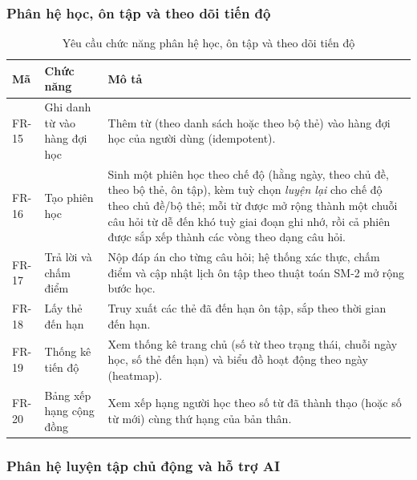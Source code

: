 \subsubsection{Phân hệ học, ôn tập và theo dõi tiến độ}

\begin{table}[h]
  \centering
  \small
  \renewcommand{\arraystretch}{1.3}
  \begin{tabular}{|p{1.7cm}|p{3.4cm}|p{9.4cm}|}
    \hline
    \textbf{Mã} & \textbf{Chức năng} & \textbf{Mô tả} \\
    \hline
    FR-15 & Ghi danh từ vào hàng đợi học & Thêm từ (theo danh sách hoặc theo bộ thẻ) vào hàng đợi học của người dùng (idempotent). \\
    \hline
    FR-16 & Tạo phiên học & Sinh một phiên học theo chế độ (hằng ngày, theo chủ đề, theo bộ thẻ, ôn tập), kèm tuỳ chọn \textit{luyện lại} cho chế độ theo chủ đề/bộ thẻ; mỗi từ được mở rộng thành một chuỗi câu hỏi từ dễ đến khó tuỳ giai đoạn ghi nhớ, rồi cả phiên được sắp xếp thành các vòng theo dạng câu hỏi. \\
    \hline
    FR-17 & Trả lời và chấm điểm & Nộp đáp án cho từng câu hỏi; hệ thống xác thực, chấm điểm và cập nhật lịch ôn tập theo thuật toán SM-2 mở rộng bước học. \\
    \hline
    FR-18 & Lấy thẻ đến hạn & Truy xuất các thẻ đã đến hạn ôn tập, sắp theo thời gian đến hạn. \\
    \hline
    FR-19 & Thống kê tiến độ & Xem thống kê trang chủ (số từ theo trạng thái, chuỗi ngày học, số thẻ đến hạn) và biểu đồ hoạt động theo ngày (heatmap). \\
    \hline
    FR-20 & Bảng xếp hạng cộng đồng & Xem xếp hạng người học theo số từ đã thành thạo (hoặc số từ mới) cùng thứ hạng của bản thân. \\
    \hline
  \end{tabular}
  \caption{Yêu cầu chức năng phân hệ học, ôn tập và theo dõi tiến độ}
  \label{tab:fr-learn}
\end{table}

\subsubsection{Phân hệ luyện tập chủ động và hỗ trợ AI}

